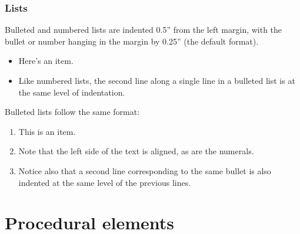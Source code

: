 {{{{\subsubsection{Lists}
Bulleted and numbered lists are indented 0.5'' from the left margin, with the bullet or number hanging in the margin by 0.25'' (the default format).

\begin{itemize}
\item
  Here's an item.

\item
  Like numbered lists, the second line along a single line in a bulleted list is
  at the same level of indentation.
\end{itemize}

Bulleted lists follow the same format:
%
\begin{enumerate}
\item
  This is an item.
\item
  Note that the left side of the text is aligned, as are the numerals.
\item
  Notice also that a second line corresponding to the same bullet is also
  indented at the same level of the previous lines.
\end{enumerate}


\section{Procedural elements}

}}}}
